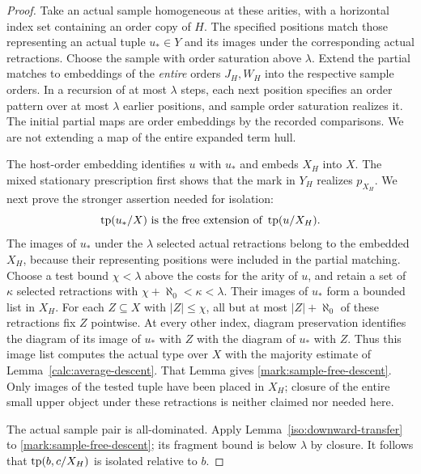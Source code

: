 \begin{proof}
Take an actual sample homogeneous at these arities, with a
horizontal index set containing an order copy of \(H\).
The specified positions match those representing an actual
tuple \(u_*\in Y\) and its images under the corresponding
actual retractions.  Choose the sample with order saturation
above \(\lambda\).  Extend the partial matches to embeddings
of the \emph{entire} orders \(J_H,W_H\) into the respective
sample orders.  In a recursion of at most \(\lambda\) steps,
each next position specifies an order pattern over at most
\(\lambda\) earlier positions, and sample order saturation
realizes it.  The initial partial maps are order embeddings
by the recorded comparisons.  We are not extending a map of
the entire expanded term hull.

The host-order embedding identifies \(u\) with \(u_*\) and
embeds \(X_H\) into \(X\).  The mixed stationary prescription
first shows that the mark in \(Y_H\) realizes \(p_{X_H}\).
We next prove the stronger assertion needed for isolation:
\begin{equation}
       \operatorname{tp}(u_*/X)\text{ is the free extension of }\operatorname{tp}(u/X_H).
       \label{mark:sample-free-descent}
\end{equation}
The images of \(u_*\) under the \(\lambda\) selected actual
retractions belong to the embedded \(X_H\), because their
representing positions were included in the partial matching.
Choose a test bound \(\chi<\lambda\) above the costs for
the arity of \(u\), and retain a set of \(\kappa\) selected
retractions with
\(\chi+\aleph_0<\kappa<\lambda\).
Their images of \(u_*\) form a bounded list in \(X_H\).
For each \(Z\subseteq X\) with \(|Z|\leq\chi\), all but
at most \(|Z|+\aleph_0\) of these retractions fix \(Z\)
pointwise.  At every other index, diagram preservation
identifies the diagram of its image of \(u_*\) with \(Z\)
with the diagram of \(u_*\) with \(Z\).  Thus this image
list computes the actual type over \(X\) with the
majority estimate of Lemma~\ref{calc:average-descent}.
That Lemma gives \eqref{mark:sample-free-descent}.
Only images of the tested tuple have been placed in
\(X_H\); closure of the entire small upper object under
these retractions is neither claimed nor needed here.

The actual sample pair is all-dominated.  Apply
Lemma~\ref{iso:downward-transfer} to
\eqref{mark:sample-free-descent}; its fragment
bound is below \(\lambda\) by closure.  It follows that
\(\operatorname{tp}(b,c/X_H)\) is isolated relative to \(b\).


\end{proof}
